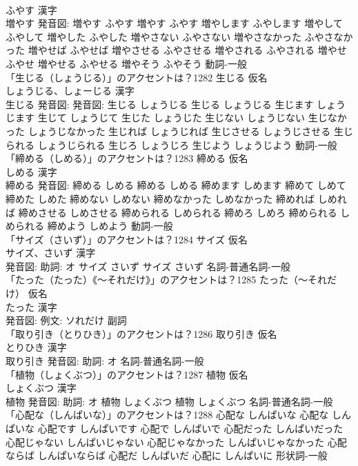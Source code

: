 \documentclass[8pt]{extreport}
\begin{document}
\begin{CJK}{UTF8}{min}
\\	ふやす 漢字　
\\	増やす 発音図:	増やす ふやす		増やす ふやす 増やします ふやします 増やして ふやして 増やした ふやした 増やさない ふやさない 増やさなかった ふやさなかった 増やせば ふやせば 増やさせる ふやさせる 増やされる ふやされる 増やせ ふやせ 増やせる ふやせる 増やそう ふやそう				動詞-一般 
\\	「生じる（しょうじる）」のアクセントは？1282	生じる 仮名　
\\	しょうじる、しょーじる 漢字　
\\	生じる 発音図: 発音図:	生じる しょうじる		生じる しょうじる 生じます しょうじます 生じて しょうじて 生じた しょうじた 生じない しょうじない 生じなかった しょうじなかった 生じれば しょうじれば 生じさせる しょうじさせる 生じられる しょうじられる 生じろ しょうじろ 生じよう しょうじよう				動詞-一般 
\\	「締める（しめる）」のアクセントは？1283	締める 仮名　
\\	しめる 漢字　
\\	締める 発音図:	締める しめる		締める しめる 締めます しめます 締めて しめて 締めた しめた 締めない しめない 締めなかった しめなかった 締めれば しめれば 締めさせる しめさせる 締められる しめられる 締めろ しめろ 締められる しめられる 締めよう しめよう				動詞-一般 
\\	「サイズ（さいず）」のアクセントは？1284	サイズ 仮名　
\\	サイズ、さいず 漢字　
\\	発音図: 助詞: オ	サイズ さいず		サイズ さいず				名詞-普通名詞-一般 
\\	「たった（たった）《〜それだけ》」のアクセントは？1285	たった（〜それだけ） 仮名　
\\	たった 漢字　
\\	発音図: 例文: ソれだけ							副詞 
\\	「取り引き（とりひき）」のアクセントは？1286	取り引き 仮名　
\\	とりひき 漢字　
\\	取り引き 発音図: 助詞: オ							名詞-普通名詞-一般 
\\	「植物（しょくぶつ）」のアクセントは？1287	植物 仮名　
\\	しょくぶつ 漢字　
\\	植物 発音図: 助詞: オ	植物 しょくぶつ		植物 しょくぶつ				名詞-普通名詞-一般 
\\	「心配な（しんぱいな）」のアクセントは？1288		心配な しんぱいな		心配な しんぱいな 心配です しんぱいです 心配で しんぱいで 心配だった しんぱいだった 心配じゃない しんぱいじゃない 心配じゃなかった しんぱいじゃなかった 心配ならば しんぱいならば 心配だ しんぱいだ 心配に しんぱいに				形状詞-一般 

\end{CJK}
\end{document}
